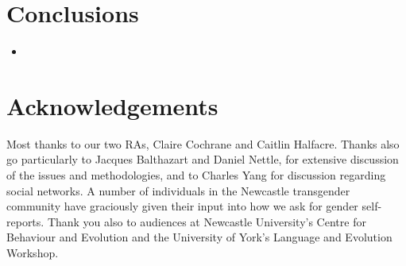 \documentclass[a0,portrait]{a0poster}
\begin{document}
\begin{multicols}{2}
\color{SaddleBrown} %

\section*{Conclusions}

\begin{itemize}
\item 
\end{itemize}

\color{DarkSlateGray} %





\section*{Acknowledgements}

Most thanks to our two RAs, Claire Cochrane and Caitlin Halfacre. Thanks also go particularly to Jacques Balthazart and Daniel Nettle, for extensive discussion of the issues and methodologies, and to Charles Yang for discussion regarding social networks. A number of individuals in the Newcastle transgender community have graciously given their input into how we ask for gender self-reports. Thank you also to audiences at Newcastle University's Centre for Behaviour and Evolution and the University of York's Language and Evolution Workshop.


\end{multicols}
\end{document}
